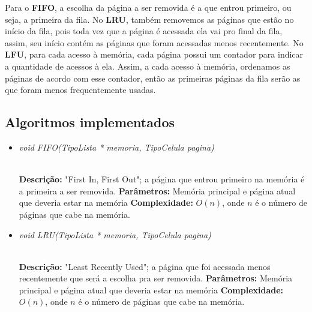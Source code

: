 \documentclass[12pt]{article}
\begin{document}
Para o \textbf{FIFO}, a escolha da página a ser removida é a que entrou primeiro, ou seja, a primeira da fila. No \textbf{LRU}, também removemos as páginas que estão no início da fila, pois toda vez que a página é acessada ela vai pro final da fila, assim, seu início contém as páginas que foram acessadas menos recentemente. No \textbf{LFU}, para cada acesso à memória, cada página possui um contador para indicar a quantidade de acessos à ela. Assim, a cada acesso à memória, ordenamos as páginas de acordo com esse contador, então as primeiras páginas da fila serão as que foram menos frequentemente usadas.

\subsection{Algoritmos implementados}

\vspace{0.2 true cm}

\begin{itemize}
 \item \begin{large}\textit{void FIFO(TipoLista * memoria, TipoCelula pagina)}\end{large}\\
 \subitem \textbf{Descrição:} "First In, First Out"; a página que entrou primeiro na memória é a primeira a ser removida.
 \subitem \textbf{Parâmetros:} Memória principal e página atual que deveria estar na memória
 \subitem \textbf{Complexidade:} $O(n)$, onde $n$ é o número de páginas que cabe na memória.
\end{itemize}

\vspace{0.2 true cm}

\begin{itemize}
 \item \begin{large}\textit{void LRU(TipoLista * memoria, TipoCelula pagina)}\end{large}\\
 \subitem \textbf{Descrição:} "Least Recently Used"; a página que foi acessada menos recentemente que será a escolha pra ser removida.
 \subitem \textbf{Parâmetros:} Memória principal e página atual que deveria estar na memória
 \subitem \textbf{Complexidade:} $O(n)$, onde $n$ é o número de páginas que cabe na memória.
\end{itemize}

\vspace{0.2 true cm}
\end{document}
